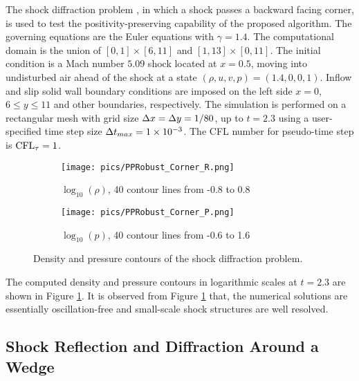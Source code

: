 The shock diffraction problem \cite{zhang2010positivity}, in which a shock passes a backward facing corner, is used to test the positivity-preserving capability of the proposed algorithm. 
The governing equations are the Euler equations with $\gamma = 1.4$.
The computational domain is the union of $[0,1]\times[6,11]$ and $[1,13]\times[0,11]$.
The initial condition is a Mach number $5.09$ shock located at $x=0.5$, moving into undisturbed air ahead of the shock at a state $(\rho, u, v, p)=(1.4,0,0,1)$.
Inflow and slip solid wall boundary conditions are imposed on the left side $x = 0$, $6\leq y \leq 11$ and other boundaries, respectively.
The simulation is performed on a rectangular mesh with grid size $\mathrm\Delta x = \mathrm\Delta y = 1/80$, up to $t=2.3$ using a user-specified time step size $\mathrm\Delta t_{max}=1\times 10^{-3}$.
The CFL number for pseudo-time step is $\text{CFL}_\tau = 1$. 

\begin{figure}[htbp]
    \centering
    \begin{subfigure}{0.5\textwidth}
        \texttt{[image: pics/PPRobust\_Corner\_R.png]}
        \caption[]{$\log_{10}(\rho)$, 40 contour lines from -0.8 to 0.8}
    \end{subfigure}\hfill
    \begin{subfigure}{0.5\textwidth}
        \texttt{[image: pics/PPRobust\_Corner\_P.png]}
        \caption[]{$\log_{10}(p)$, 40 contour lines from -0.6 to 1.6}
    \end{subfigure}
    \caption{Density and pressure contours of the shock diffraction problem.}
    \label{fig:Corner}
\end{figure}

The computed density and pressure contours in logarithmic scales at $t=2.3$ are shown in Figure \ref{fig:Corner}. It is observed from Figure \ref{fig:Corner} that, the numerical solutions are essentially oscillation-free and small-scale shock structures are well resolved.


\subsection{Shock Reflection and Diffraction Around a Wedge}

